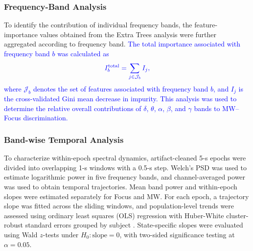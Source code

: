 \documentclass[conference]{IEEEtran}
\begin{document}
\subsubsection{Frequency-Band Analysis}

To identify the contribution of individual frequency bands, the feature-importance values obtained from the Extra Trees analysis were further aggregated according to frequency band. \textcolor{blue}{The total importance associated with frequency band $b$ was calculated as}
\begin{equation}
{\color{blue}
I_b^{\mathrm{total}}
=
\sum_{j\in\mathcal{J}_b} I_j,
}
\end{equation}
\textcolor{blue}{where $\mathcal{J}_b$ denotes the set of features associated with frequency band $b$, and $I_j$ is the cross-validated Gini mean decrease in impurity. This analysis was used to determine the relative overall contributions of $\delta$, $\theta$, $\alpha$, $\beta$, and $\gamma$ bands to MW--Focus discrimination.}

\subsubsection{Band-wise Temporal Analysis}

To characterize within-epoch spectral dynamics, artifact-cleaned 5-s epochs
were divided into overlapping 1-s windows with a 0.5-s step. Welch's PSD was
used to estimate logarithmic power in five frequency bands, and
channel-averaged power was used to obtain temporal trajectories. Mean band
power and within-epoch slopes were estimated separately for Focus and MW.
For each epoch, a trajectory slope was fitted across the sliding windows,
and population-level trends were assessed using ordinary least squares (OLS)
regression with Huber-White cluster-robust standard errors grouped by
subject \cite{white1980heteroskedasticity,rogers1994regression}.
State-specific slopes were evaluated using Wald $z$-tests under
$H_0:\text{slope}=0$, with two-sided significance testing at
$\alpha=0.05$.

\end{document}
